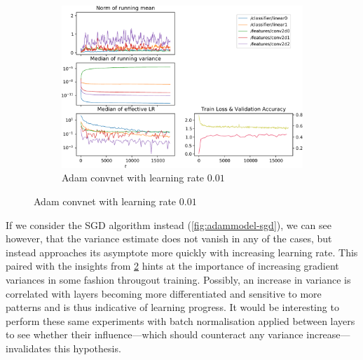 \begin{figure}
    \begin{subfigure}{\textwidth}
        \centering
        \includegraphics[width=\linewidth]{gfx/diagrams/experiments/adam/adammodel_adam_001_0_-1.pdf}
        \caption{Adam convnet with learning rate $0.01$}
        \label{fig:adammodel-3}
    \end{subfigure}
    \label{fig:adammodel}
\end{figure}

If we consider the SGD algorithm instead (\cref{fig:adammodel-sgd}), we can see
however, that the variance estimate does not vanish in any of the cases, but
instead approaches its asymptote more quickly with increasing learning rate.
This paired with the insights from \cref{fig:adammodel} hints at the importance
of increasing gradient variances in some fashion througout training. Possibly,
an increase in variance is correlated with layers becoming more differentiated
and sensitive to more patterns and is thus indicative of learning progress.
It would be interesting to perform these same experiments with batch
normalisation applied between layers to see whether their influence---which
should counteract any variance increase---invalidates this hypothesis.


